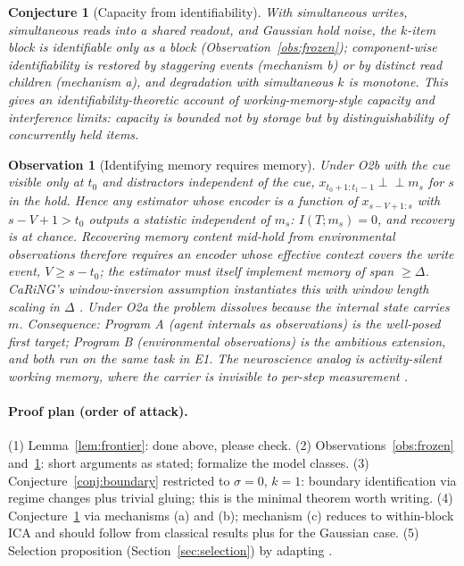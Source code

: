 \documentclass[11pt]{article}
\newcommand{\indep}{\perp\!\!\!\perp}
\theoremstyle{plain}
\newtheorem{conjecture}{Conjecture}
\newtheorem{observation}{Observation}
\theoremstyle{definition}
\begin{document}
\begin{conjecture}[Capacity from identifiability]\label{conj:capacity}
With simultaneous writes, simultaneous reads into a shared readout, and Gaussian hold noise, the $k$-item block is identifiable only as a block (Observation~\ref{obs:frozen}); component-wise identifiability is restored by staggering events (mechanism b) or by distinct read children (mechanism a), and degradation with simultaneous $k$ is monotone. This gives an identifiability-theoretic account of working-memory-style capacity and interference limits: capacity is bounded not by storage but by \emph{distinguishability} of concurrently held items.
\end{conjecture}

\begin{observation}[Identifying memory requires memory]\label{obs:window}
Under O2b with the cue visible only at $t_0$ and distractors independent of the cue, $x_{t_0+1:t_1-1} \indep m_s$ for $s$ in the hold. Hence any estimator whose encoder is a function of $x_{s-V+1:s}$ with $s - V + 1 > t_0$ outputs a statistic independent of $m_s$: $I(T; m_s) = 0$, and recovery is at chance. Recovering memory content mid-hold from environmental observations therefore requires an encoder whose effective context covers the write event, $V \ge s - t_0$; the estimator must itself implement memory of span $\ge \Delta$. CaRiNG's window-inversion assumption instantiates this with window length scaling in $\Delta$ \cite{chen2024caring}. Under O2a the problem dissolves because the internal state carries $m$. Consequence: \emph{Program A} (agent internals as observations) is the well-posed first target; \emph{Program B} (environmental observations) is the ambitious extension, and both run on the same task in E1. The neuroscience analog is activity-silent working memory, where the carrier is invisible to per-step measurement \cite{stokes2015}.
\end{observation}

\paragraph{Proof plan (order of attack).}
(1) Lemma~\ref{lem:frontier}: done above, please check.
(2) Observations~\ref{obs:frozen} and~\ref{obs:window}: short arguments as stated; formalize the model classes.
(3) Conjecture~\ref{conj:boundary} restricted to $\sigma = 0$, $k = 1$: boundary identification via regime changes plus trivial gluing; this is the minimal theorem worth writing.
(4) Conjecture~\ref{conj:capacity} via mechanisms (a) and (b); mechanism (c) reduces to within-block ICA and should follow from classical results plus \cite{zheng2022} for the Gaussian case.
(5) Selection proposition (Section~\ref{sec:selection}) by adapting \cite{zheng2024selection}.
\end{document}
